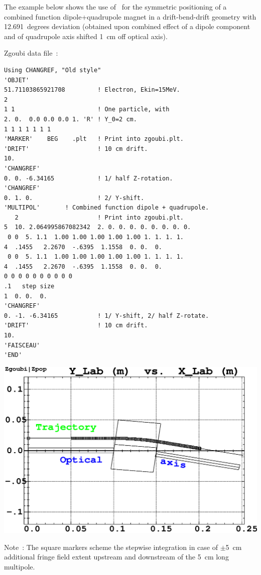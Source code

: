 \medskip


\noindent The example below shows the use of  \CHANGREF\ for the symmetric positioning of 
a combined function dipole+quadrupole  magnet in a drift-bend-drift geometry with 
12.691~degrees deviation (obtained upon combined effect of  a dipole component and 
of quadrupole axis shifted 1~cm off optical axis). 

\medskip

\begin{minipage}{1.\linewidth}
\begin{minipage}{.52\linewidth}

 Zgoubi data file~: 

\footnotesize
\begin{verbatim}
Using CHANGREF, "Old style"
'OBJET'
51.71103865921708         ! Electron, Ekin=15MeV.
2
1 1                       ! One particle, with
2. 0.  0.0 0.0 0.0 1. 'R' ! Y_0=2 cm. 
1 1 1 1 1 1 1 
'MARKER'    BEG    .plt   ! Print into zgoubi.plt.
'DRIFT'                   ! 10 cm drift.
10.
'CHANGREF'  
0. 0. -6.34165            ! 1/ half Z-rotation.
'CHANGREF'  
0. 1. 0.                  ! 2/ Y-shift.
'MULTIPOL'       ! Combined function dipole + quadrupole.
   2                      ! Print into zgoubi.plt.
5  10. 2.064995867082342  2. 0. 0. 0. 0. 0. 0. 0. 0.
 0 0  5. 1.1  1.00 1.00 1.00 1.00 1.00 1. 1. 1. 1.                              
4  .1455   2.2670  -.6395  1.1558  0. 0.  0.                                    
 0 0  5. 1.1  1.00 1.00 1.00 1.00 1.00 1. 1. 1. 1.                              
4  .1455   2.2670  -.6395  1.1558  0. 0.  0.                                    
0 0 0 0 0 0 0 0 0 0
.1   step size
1  0. 0.  0.
'CHANGREF'
0. -1. -6.34165           ! 1/ Y-shift, 2/ half Z-rotate.
'DRIFT'                   ! 10 cm drift.
10.
'FAISCEAU'
'END'
\end{verbatim}
\normalsize
\end{minipage}\hspace{.05\linewidth}
\begin{minipage}{.35\linewidth}
\centerline{\includegraphics*[bbllx=20,bblly=100,bburx=567,bbury=470,width=1.\linewidth]{FigCHAREFb.eps}}

Note~: The square markers scheme the stepwise integration in case of $\pm$5~cm additional fringe field 
extent upstream and downstream of the 5~cm long multipole. 
\end{minipage}
\end{minipage}
